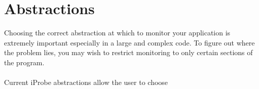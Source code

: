 \section{Abstractions}
\label{sec:abstractions}

Choosing the correct abstraction at which to monitor your application is 
extremely important especially in a large and complex code.
To figure out where the problem lies, you may wish to restrict monitoring to 
only certain sections of the program. 
\\ \\
Current iProbe abstractions allow the user to choose 